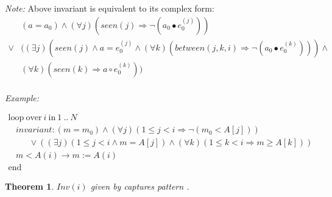 \documentclass[a4paper,10pt]{article}
\newcommand{\idx}{\ensuremath{i}\xspace}
\newcommand{\at}[1]{{(#1)}}
\newcommand{\KWloop}{\ensuremath{\mathrm{loop}~}}
\newcommand{\KWend}{\ensuremath{\mathrm{end}~}}
\newcommand{\KWover}{\ensuremath{\mathrm{over}~}}
\newcommand{\KWin}{\ensuremath{~\mathrm{in}~}}
\newcommand{\impl}{\ensuremath{\Longrightarrow}}
\newcommand{\seen}[1]{\ensuremath{\mathit{seen}(#1)}\xspace}
\newcommand{\between}[3]{\ensuremath{\mathit{between}{(#1,#2,#3)}}\xspace}
\newcommand{\patternexample}{\noindent\textit{Example:}\xspace}
\newcommand{\patternnote}{\noindent\textit{Note:}\xspace}
\newcommand{\Inv}[1]{\ensuremath{\mathit{Inv}(#1)\xspace}}
\newtheorem{theorem}{Theorem}[section]
\begin{document}
\vspace{0.5cm}
\patternnote Above invariant is equivalent to its complex form:
\begin{eqnarray*}
&(a = a_0) \land (\forall j)(\seen{j} \impl \neg (a_0 \bullet e_0^\at{j}))\\
\lor 
& ((\exists j)(\seen{j} \land a = e_0^\at{j} \land (\forall k)(\between{j}{k}{i} \impl 
  \neg (a_0 \bullet e_0^\at{k}))) \land \\
&(\forall k)(\seen{k} \impl a \circ e_0^\at{k}))\\
\end{eqnarray*}

\patternexample

$\begin{array}{l}
  \KWloop \KWover i \KWin 1~..~N \\
  ~~~~ \textit{invariant}: (m = m_0) \land (\forall j)(1\leq j < i \impl \neg (m_0 < A[j]))\\
  ~~~~~~~~~~~ \lor ((\exists j)(1\leq j < i \land m = A[j]) \land (\forall k)(1\leq k < i \impl m \geq A[k]))\\
  ~~~~ m < A(i) \rightarrow m := A(i)\\
  \KWend
\end{array}$

\begin{theorem}
  \Inv{\idx} given by \curinv captures pattern \curpattern.
\end{theorem}
\end{document}

